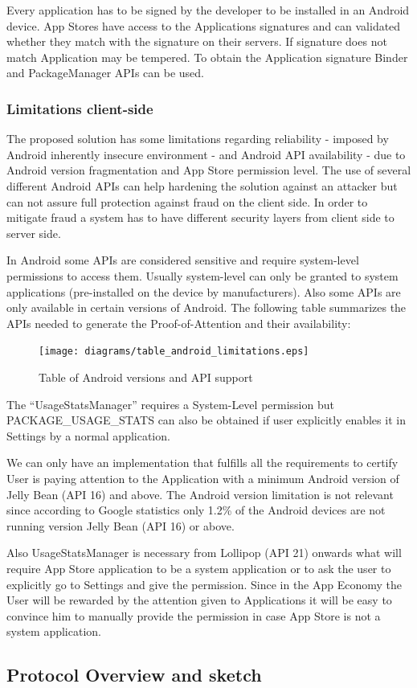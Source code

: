 Every application has to be signed by the developer to be installed in an Android device. App Stores have access to the Applications signatures and can validated whether they match with the signature on their servers. If signature does not match Application may be tempered. To obtain the Application signature Binder and PackageManager APIs can be used.

\subsubsection{Limitations client-side}

The proposed solution has some limitations regarding reliability - imposed by Android inherently insecure environment - and Android API availability - due to Android version fragmentation and App Store permission level. The use of several different Android APIs can help hardening the solution against an attacker but can not assure full protection against fraud on the client side. In order to mitigate fraud a system has to have different security layers from client side to server side. 

In Android some APIs are considered sensitive and require system-level permissions to access them. Usually system-level can only be granted to system applications (pre-installed on the device by manufacturers). Also some APIs are only available in certain versions of Android. The following table summarizes the APIs needed to generate the Proof-of-Attention and their availability:


\begin{figure}[!ht]
\centering
\texttt{[image: diagrams/table\_android\_limitations.eps]}
\caption{Table of Android versions and API support}
\label{fig:android_versions}
\end{figure}

The ``UsageStatsManager'' requires a System-Level permission but PACKAGE\_USAGE\_STATS can also be obtained if user explicitly enables it in Settings by a normal application.

We can only have an implementation that fulfills all the requirements to certify User is paying attention to the Application with a minimum Android version of Jelly Bean (API 16) and above. The Android version limitation is not relevant since according to Google statistics only 1.2\% of the Android devices are not running version Jelly Bean (API 16) or above. 

Also UsageStatsManager is necessary from Lollipop (API 21) onwards what will require App Store application to be a system application or to ask the user to explicitly go to Settings and give the permission. Since in the App Economy the User will be rewarded by the attention given to Applications it will be easy to convince him to manually provide the permission in case App Store is not a system application.


\subsection{Protocol Overview and sketch}





%


